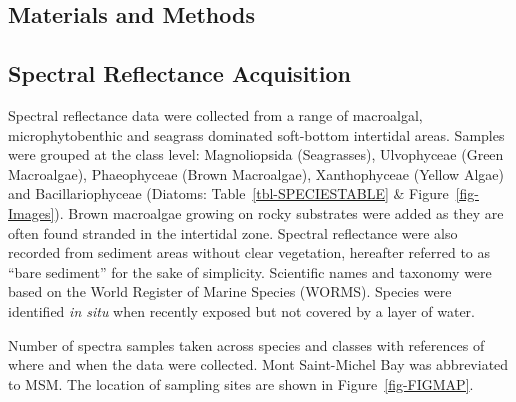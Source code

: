 \documentclass[
  letterpaper,
  11pt,
  english,
  singlespacing,
  headsepline]{MastersDoctoralThesis}
\begin{document}
\begin{spacing}{1.5}
\section{Materials and Methods}\label{materials-and-methods}

\subsection{Spectral Reflectance
Acquisition}\label{spectral-reflectance-acquisition}

Spectral reflectance data were collected from a range of macroalgal,
microphytobenthic and seagrass dominated soft-bottom intertidal areas.
Samples were grouped at the class level: Magnoliopsida (Seagrasses),
Ulvophyceae (Green Macroalgae), Phaeophyceae (Brown Macroalgae),
Xanthophyceae (Yellow Algae) and Bacillariophyceae (Diatoms:
Table~\ref{tbl-SPECIESTABLE} \& Figure~\ref{fig-Images}). Brown
macroalgae growing on rocky substrates were added as they are often
found stranded in the intertidal zone. Spectral reflectance were also
recorded from sediment areas without clear vegetation, hereafter
referred to as ``bare sediment'' for the sake of simplicity. Scientific
names and taxonomy were based on the World Register of Marine Species
(WORMS). Species were identified \emph{in situ} when recently exposed
but not covered by a layer of water.

\begin{table}

\caption{\label{tbl-SPECIESTABLE}Number of spectra samples taken across
species and classes with references of where and when the data were
collected. Mont Saint-Michel Bay was abbreviated to MSM. The location of
sampling sites are shown in Figure~\ref{fig-FIGMAP}.}

\centering{

}
\end{table}
\end{spacing}
\end{document}
